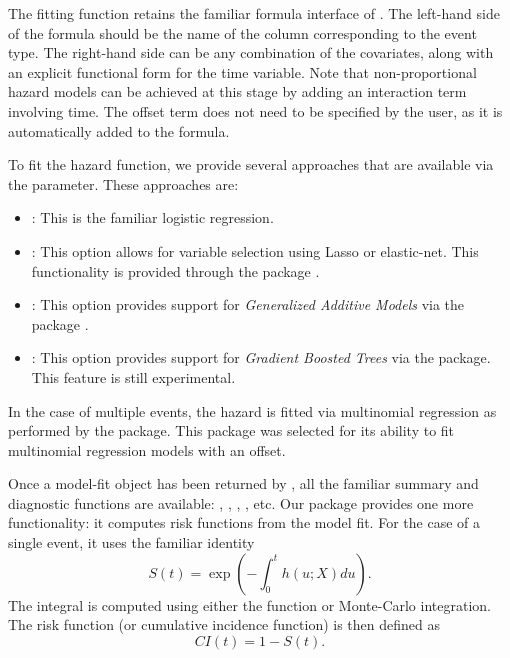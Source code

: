 \documentclass[
]{jss}
\providecommand{\tightlist}{%
  \setlength{\itemsep}{0pt}\setlength{\parskip}{0pt}}
\begin{document}
The fitting function retains the familiar formula interface of
. The left-hand side of the formula should be the name of the
column corresponding to the event type. The right-hand side can be any
combination of the covariates, along with an explicit functional form
for the time variable. Note that non-proportional hazard models can be
achieved at this stage by adding an interaction term involving time. The
offset term does not need to be specified by the user, as it is
automatically added to the formula.

To fit the hazard function, we provide several approaches that are
available via the  parameter. These approaches are:

\begin{itemize}
\tightlist
\item
  : This is the familiar logistic regression.
\item
  : This option allows for variable selection using Lasso
  or elastic-net. This functionality is provided through the
   package \citep{friedman2010jss}.
\item
  : This option provides support for \emph{Generalized
  Additive Models} via the  package
  \citep{hastie1987generalized}.
\item
  : This option provides support for \emph{Gradient Boosted
  Trees} via the  package. This feature is still experimental.
\end{itemize}

In the case of multiple events, the hazard is fitted via multinomial
regression as performed by the  package. This package was
selected for its ability to fit multinomial regression models with an
offset.

Once a model-fit object has been returned by , all
the familiar summary and diagnostic functions are available:
, , , , etc. Our
package provides one more functionality: it computes risk functions from
the model fit. For the case of a single event, it uses the familiar
identity \begin{equation}\label{eqn:surv}
S(t) = \exp\left(-\int_0^t h(u;X) du\right).
\end{equation} The integral is computed using either the
 function or Monte-Carlo integration. The risk
function (or cumulative incidence function) is then defined as
\begin{equation}\label{eqn:CI}
CI(t) = 1 - S(t).
\end{equation}
\end{document}
